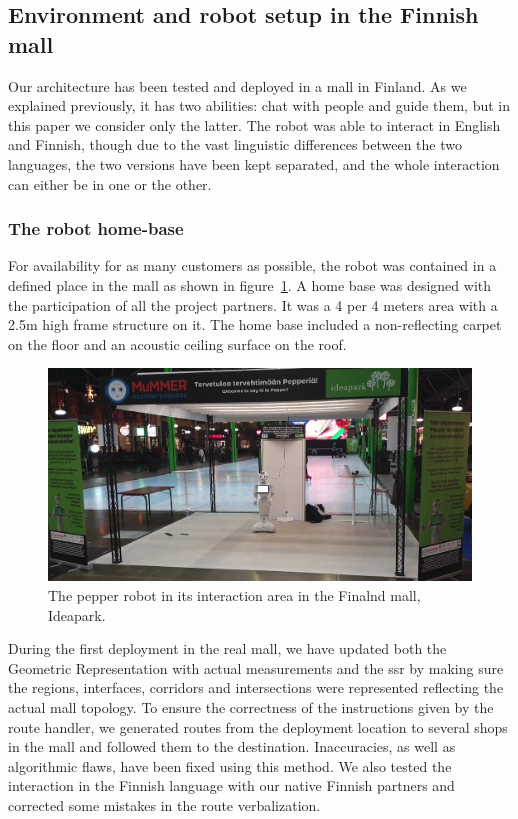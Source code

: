 \documentclass[a4paper,11pt,twoside]{StyleThese}
\begin{document}
\subsection{Environment and robot setup in the Finnish mall}\label{subsec:setup_mall}
Our architecture has been tested and deployed in a mall in Finland. As we explained previously, it has two abilities: chat with people and guide them, but in this paper we consider only the latter. The robot was able to interact in English and Finnish, though due to the vast linguistic differences between the two languages, the two versions have been kept separated, and the whole interaction can either be in one or the other. 

\subsubsection{The robot home-base}

For availability for as many customers as possible, the robot was contained in a defined place in the mall as shown in figure~\ref{fig:chap3_pepper_mall}. A home base was designed with the participation of all the project partners. It was a 4 per 4 meters area with a 2.5m high frame structure on it. The home base included a non-reflecting carpet on the floor and an acoustic ceiling surface on the roof.

\begin{figure}[ht!]
	\centering
	\includegraphics[scale=0.2]{figures/chapter3/pepper_mall.png}
	\caption{\label{fig:chap3_pepper_mall} The pepper robot in its interaction area in the Finalnd mall, Ideapark. }
\end{figure}

During the first deployment in the real mall, we have updated both the Geometric Representation with actual measurements and the \acrfull{ssr} by making sure the regions, interfaces, corridors and intersections were represented reflecting the actual mall topology. To ensure the correctness of the instructions given by the route handler, we generated routes from the deployment location to several shops in the mall and followed them to the destination. Inaccuracies, as well as algorithmic flaws, have been fixed using this method. We also tested the interaction in the Finnish language with our native Finnish partners and corrected some mistakes in the route verbalization.
\end{document}
